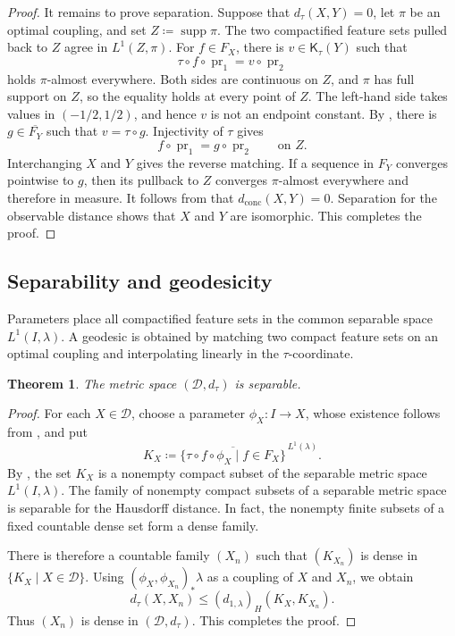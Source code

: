 \documentclass[10pt,a4paper]{amsart}
\newtheorem{theorem}{Theorem}[section]
\newcommand{\D}{\mathcal D}
\newcommand{\Kc}{\mathsf K}
\newcommand{\dconc}{d_{\mathrm{conc}}}
\newcommand{\dtau}{d_{\tau}}
\DeclareMathOperator{\pr}{pr}
\DeclareMathOperator{\supp}{supp}
\begin{document}
\begin{proof}
It remains to prove separation. Suppose that $\dtau(X,Y)=0$, let $\pi$ be an optimal coupling, and set $Z\coloneqq\supp\pi$. The two compactified feature sets pulled back to $Z$ agree in $L^1(Z,\pi)$. For $f\in F_X$, there is $v\in\Kc_\tau(Y)$ such that
\[
\tau\circ f\circ\pr_1=v\circ\pr_2
\]
holds $\pi$-almost everywhere. Both sides are continuous on $Z$, and $\pi$ has full support on $Z$, so the equality holds at every point of $Z$. The left-hand side takes values in $(-1/2,1/2)$, and hence $v$ is not an endpoint constant. By , there is $g\in\overline{F_Y}$ such that $v=\tau\circ g$. Injectivity of $\tau$ gives
\[
f\circ\pr_1=g\circ\pr_2\qquad\text{on }Z.
\]
Interchanging $X$ and $Y$ gives the reverse matching. If a sequence in $F_Y$ converges pointwise to $g$, then its pullback to $Z$ converges $\pi$-almost everywhere and therefore in measure. It follows from  that $\dconc(X,Y)=0$. Separation for the observable distance \cite[Theorem~3.10]{hanika2022gds} shows that $X$ and $Y$ are isomorphic. This completes the proof.
\end{proof}

\subsection{Separability and geodesicity}
\label{subsec:dtau-geometry}

Parameters place all compactified feature sets in the common separable space $L^1(I,\lambda)$. A geodesic is obtained by matching two compact feature sets on an optimal coupling and interpolating linearly in the $\tau$-coordinate.

\begin{theorem}
\label{thm:dtau-separable}
The metric space $(\D,\dtau)$ is separable.
\end{theorem}

\begin{proof}
For each $X\in\D$, choose a parameter $\phi_X\colon I\to X$, whose existence follows from \cite[Theorem~17.41]{kechris1995classical}, and put
\[
K_X\coloneqq
\overline{\{\tau\circ f\circ\phi_X\mid f\in F_X\}}^{\,L^1(\lambda)}.
\]
By , the set $K_X$ is a nonempty compact subset of the separable metric space $L^1(I,\lambda)$. The family of nonempty compact subsets of a separable metric space is separable for the Hausdorff distance. In fact, the nonempty finite subsets of a fixed countable dense set form a dense family.

There is therefore a countable family $(X_n)$ such that $(K_{X_n})$ is dense in $\{K_X\mid X\in\D\}$. Using $(\phi_X,\phi_{X_n})_*\lambda$ as a coupling of $X$ and $X_n$, we obtain
\[
\dtau(X,X_n)\leq(d_{1,\lambda})_H(K_X,K_{X_n}).
\]
Thus $(X_n)$ is dense in $(\D,\dtau)$. This completes the proof.
\end{proof}
\end{document}
